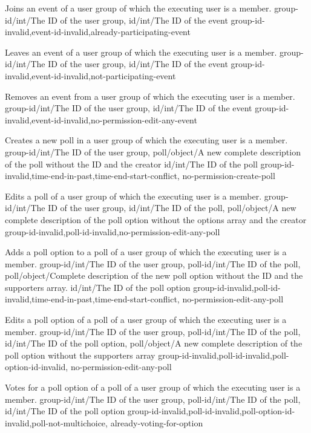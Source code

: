 \documentclass[parskip=full,11pt]{scrartcl}
\begin{document}
{Joins an event of a user group of which the executing user is a member.}
{group-id/int/The ID of the user group,
id/int/The ID of the event}
{}
{group-id-invalid,event-id-invalid,already-participating-event}
{}

{Leaves an event of a user group of which the executing user is a member.}
{group-id/int/The ID of the user group,
id/int/The ID of the event}
{}
{group-id-invalid,event-id-invalid,not-participating-event}
{}

{Removes an event from a user group of which the executing user is a member.}
{group-id/int/The ID of the user group,
id/int/The ID of the event}
{}
{group-id-invalid,event-id-invalid,no-permission-edit-any-event}
{}

{Creates a new poll in a user group of which the executing user is a member.}
{group-id/int/The ID of the user group,
poll/object/A new complete description of the poll without the ID and the
creator}
{id/int/The ID of the poll}
{group-id-invalid,time-end-in-past,time-end-start-conflict,
no-permission-create-poll}
{}

{Edits a poll of a user group of which the executing user is a member.}
{group-id/int/The ID of the user group,
id/int/The ID of the poll,
poll/object/A new complete description of the poll option without
the options array and the creator}
{}
{group-id-invalid,poll-id-invalid,no-permission-edit-any-poll}
{}

{Adds a poll option to a poll of a user group of which the executing user is a
member.}
{group-id/int/The ID of the user group,
poll-id/int/The ID of the poll,
poll/object/Complete description of the new poll option without the ID and the
supporters array.}
{id/int/The ID of the poll option}
{group-id-invalid,poll-id-invalid,time-end-in-past,time-end-start-conflict,
no-permission-edit-any-poll}
{}

{Edits a poll option of a poll of a user group of which the executing user is
a member.}
{group-id/int/The ID of the user group,
poll-id/int/The ID of the poll,
id/int/The ID of the poll option,
poll/object/A new complete description of the poll option without the
supporters array}
{}
{group-id-invalid,poll-id-invalid,poll-option-id-invalid,%
no-permission-edit-any-poll}
{}

{Votes for a poll option of a poll of a user group of which the executing user
is a member.}
{group-id/int/The ID of the user group,
poll-id/int/The ID of the poll,
id/int/The ID of the poll option}
{}
{group-id-invalid,poll-id-invalid,poll-option-id-invalid,poll-not-multichoice,
already-voting-for-option}
{}
\end{document}
